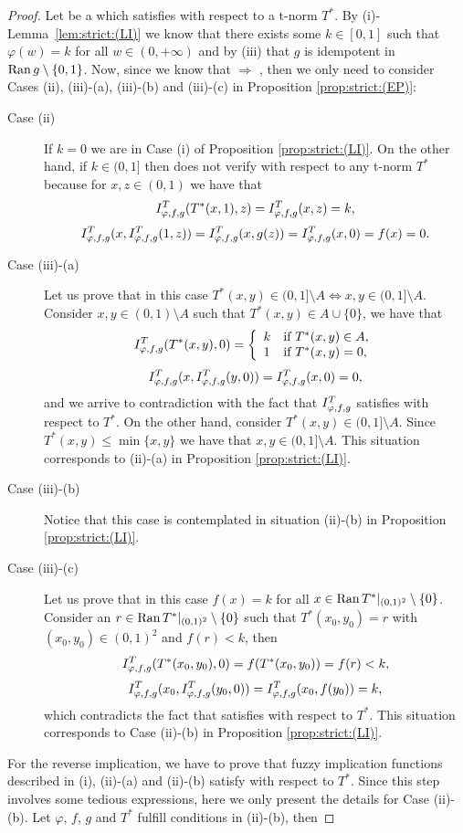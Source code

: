 \begin{proof}
	Let \IT be a \STP which satisfies \LI with respect to a t-norm $T^*$. {By (i)-Lemma~\ref{lem:strict:(LI)}} we know that there exists some $k \in [0,1]$ such that $\varphi(w)=k$ for all $w \in (0,+\infty)$ and by (iii) that $g$ is idempotent in $\operatorname{Ran} g \setminus \{0,1\}$. Now, since we know that \LI $\Rightarrow$ \EP, then we only need to consider Cases (ii), (iii)-(a), (iii)-(b) and (iii)-(c) in Proposition \ref{prop:strict:(EP)}:
	\begin{description}
		\item[ Case (ii)] If $k=0$ we are in Case (i) of Proposition \ref{prop:strict:(LI)}. On the other hand, if $k \in (0,1]$ then \IT does not verify \LI with respect to any t-norm $T^*$ because for $x,z \in (0,1)$ we have that
		$$ I^T_{\varphi,f,g}(T^*(x,1),z)=I^T_{\varphi,f,g}(x,z)=k,$$
		$$I^T_{\varphi,f,g}(x,I^T_{\varphi,f,g}(1,z))=I^T_{\varphi,f,g}(x,g(z))=I^T_{\varphi,f,g}(x,0)=f(x)=0.$$
		\item[Case (iii)-(a)] Let us prove that in this case $T^*(x,y) \in (0,1] \setminus A \Leftrightarrow x,y \in (0,1] \setminus A$. Consider $x,y \in (0,1)\setminus A$ such that $T^*(x,y) \in A \cup \{0\}$, we have that
		$$I^T_{\varphi,f,g}(T^*(x,y),0)=\left\{ \begin{array}{ll}
			k &   \text{if }   T^*(x,y) \in A, \\
			1 &  \text{if }   T^*(x,y)=0,	\end{array}
		\right. $$
		$$I^T_{\varphi,f,g}(x,I^T_{\varphi,f,g}(y,0))=I^T_{\varphi,f,g}(x,0)=0,$$
		and we arrive to contradiction with the fact that $I^T_{\varphi,f,g}$ satisfies \LI with respect to $T^*$. 		
		On the other hand, consider $T^*(x,y)\in (0,1]\setminus A$. Since $T^*(x,y) \leq \min\{x,y\}$ we have that $x,y \in (0,1] \setminus A$. This situation corresponds to (ii)-(a) in Proposition \ref{prop:strict:(LI)}.
		\item[Case (iii)-(b)] Notice that this case is contemplated in situation (ii)-(b) in Proposition \ref{prop:strict:(LI)}.
		\item[Case (iii)-(c)]  Let us prove that in this case $f(x)=k$ for all $x \in \operatorname{Ran} T^*|_{(0,1)^2} \setminus \{0\}$. Consider an $r \in \operatorname{Ran} T^*|_{(0,1)^2} \setminus \{0\}$ such that $T^*(x_0,y_0)=r$ with $(x_0,y_0)\in (0,1)^2$ and $f(r)<k$, then
		$$I^T_{\varphi,f,g}(T^*(x_0,y_0),0)=f(T^*(x_0,y_0))=f(r)<k,$$
		$$I^T_{\varphi,f,g}(x_0,I^T_{\varphi,f,g}(y_0,0))=I^T_{\varphi,f,g}(x_0,f(y_0))=k,$$
		which contradicts the fact that \IT satisfies \LI with respect to $T^*$. This situation corresponds to Case (ii)-(b) in Proposition \ref{prop:strict:(LI)}.
	\end{description}
	For the reverse implication, we have to prove that fuzzy implication functions described in (i), (ii)-(a) and (ii)-(b) satisfy \LI with respect to $T^*$. Since this step involves some tedious expressions, here we only present the details for Case (ii)-(b). Let $\varphi$, $f$, $g$ and $T^*$ fulfill conditions in (ii)-(b), then

\end{proof}
